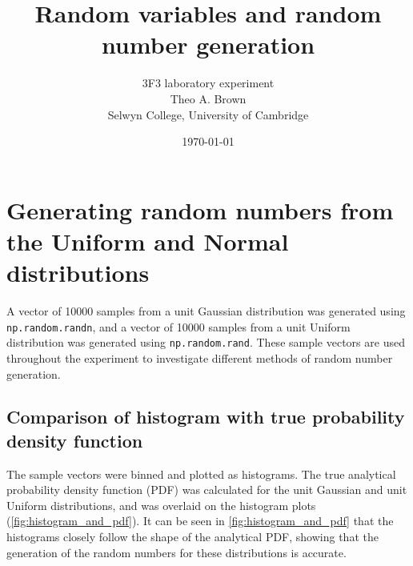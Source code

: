 \documentclass[a4paper]{article}
\begin{document}

\title{Random variables and random number generation}
\author{3F3 laboratory experiment \\ Theo A. Brown \\ Selwyn College, University of Cambridge}
\date{\today}
\maketitle

\tableofcontents


\section{Generating random numbers from the Uniform and Normal distributions}
\label{sec:uniform_normal}

A vector of 10000 samples from a unit Gaussian distribution was generated using \verb`np.random.randn`, and a vector of
10000 samples from a unit Uniform distribution was generated using \verb`np.random.rand`.
These sample vectors are used throughout the experiment to investigate different methods of random number generation.


\subsection{Comparison of histogram with true probability density function}

The sample vectors were binned and plotted as histograms.
The true analytical probability density function (PDF) was calculated for the unit Gaussian and unit Uniform
distributions, and was overlaid on the histogram plots (\autoref{fig:histogram_and_pdf}).
It can be seen in \autoref{fig:histogram_and_pdf} that the histograms closely follow the shape of the analytical PDF,
showing that the generation of the random numbers for these distributions is accurate.
\end{document}
